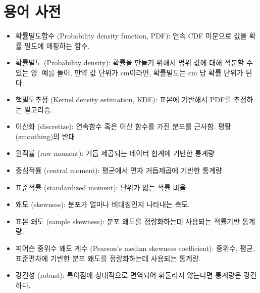 \section{용어 사전}

\begin{itemize}

\item 확률밀도함수 (Probability density function, PDF): 
연속 CDF 미분으로 값을 확률 밀도에 매핑하는 함수.

\item 확률밀도 (Probability density): 
  확률을 만들기 위해서 범위 값에 대해 적분할 수 있는 양.
  예를 들어, 만약 값 단위가 cm이라면, 확률밀도는 cm 당 확률 단위가 된다. 

\item 핵밀도추정 (Kernel density estimation, KDE): 
  표본에 기반해서 PDF를 추정하는 알고리즘.

\item 이산화 (discretize): 
  연속함수 혹은 이산 함수를 가진 분포를 근사함. 평활(smoothing)의 반대.

\item 원적률 (raw moment): 
  거듭 제곱되는 데이터 합계에 기반한 통계량

\item 중심적률 (central moment): 
  평균에서 편차 거듭제곱에 기반한 통계량.

\item 표준적률 (standardized moment): 
  단위가 없는 적률 비율.

\item 왜도 (skewness): 
  분포가 얼마나 비대칭인지 나타내는 측도.

\item 표본 왜도 (sample skewness): 
  분포 왜도를 정량화하는데 사용되는 적률기반 통계량.

\item 피어슨 중위수 왜도 계수 (Pearson's median skewness coefficient): 
  중위수, 평균, 표준편차에 기반한 분포 왜도를 정량화하는데 사용되는 통계량.

\item 강건성 (robust): 
  특이점에 상대적으로 면역되어 휘둘리지 않는다면 통계량은 강건하다.

\end{itemize}

